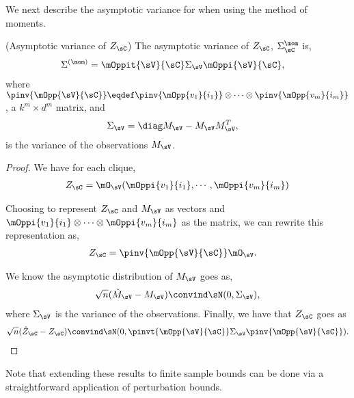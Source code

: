We next describe the asymptotic variance for \LearnClique when using the
  method of moments.
\begin{lemma}(Asymptotic variance of $Z_\sC$)
  \label{lem:mom-variance}  
  The asymptotic variance of $Z_\sC$, $\Sigma^\mom_\sC$ is,
  \begin{align*}
    \Sigma^{(\mom)} &= \mOppit{\sV}{\sC} \Sigma_\sV \mOppi{\sV}{\sC},
  \end{align*}
  where $\pinv{\mOpp{\sV}{\sC}} \eqdef \pinv{\mOpp{v_1}{i_1}} \otimes
    \cdots \otimes \pinv{\mOpp{v_m}{i_m}}$, a $k^m \times d^m$ matrix, and 
\begin{align*}
  \Sigma_\sV &= \diag  M_\sV  - M_\sV M_\sV^T,
\end{align*}
  is the variance of the observations $M_\sV$.
\end{lemma}
\begin{proof}
We have for each clique,
\begin{align*}
  Z_{\sC} &= \mO_\sV(\mOppi{v_1}{i_1},\cdots,\mOppi{v_m}{i_m}) \\
\end{align*}

Choosing to represent $Z_\sC$ and $M_\sV$ as vectors and
$\mOppi{v_1}{i_1} \otimes \cdots \otimes \mOppi{v_m}{i_m}$ as the
matrix, we can rewrite this representation as,
\begin{align*}
  Z_{\sC} &= \pinv{\mOpp{\sV}{\sC}} \mO_\sV.
\end{align*}

We know the asymptotic distribution of $M_\sV$ goes as,
\begin{align*}
  \sqrt{n}(\hat M_\sV - M_\sV) \convind \sN(0, \Sigma_\sV),
\end{align*}
where $\Sigma_\sV$ is the variance of the observations. 
Finally, we have that $Z_\sC$ goes as
\begin{align*}
  \sqrt{n}(\hat Z_\sC - Z_\sC) \convind \sN(0, \pinvt{\mOpp{\sV}{\sC}} \Sigma_\sV \pinv{\mOpp{\sV}{\sC}}).
\end{align*}
\end{proof}

Note that extending these results to finite sample bounds can be done
  via a straightforward application of perturbation bounds.

